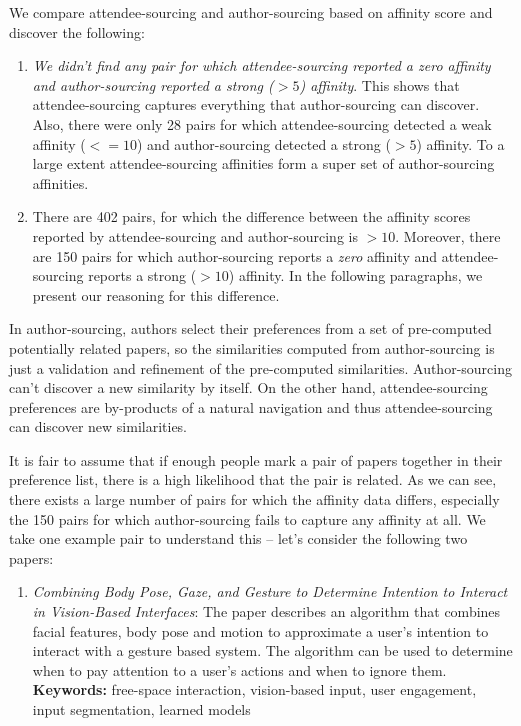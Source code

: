 \documentclass[letterpaper]{article}
\begin{document}
\begin{enumerate}
We compare attendee-sourcing and author-sourcing based on affinity score and discover the following:
\begin{enumerate}
\item \emph{We didn't find any pair for which attendee-sourcing reported a zero affinity and author-sourcing reported a strong ($>5$) affinity}. This shows that attendee-sourcing captures everything that author-sourcing can discover. Also, there were only 28 pairs for which attendee-sourcing detected a weak affinity ($<=10$) and author-sourcing detected a strong ($>5$) affinity. To a large extent attendee-sourcing affinities form a super set of author-sourcing affinities.

\item There are 402 pairs, for which the difference between the affinity scores reported by attendee-sourcing and author-sourcing is $>10$. Moreover, there are 150 pairs for which author-sourcing reports a \emph{zero} affinity and attendee-sourcing reports a strong ($>10$) affinity. In the following paragraphs, we present our reasoning for this difference.

\end{enumerate}
In author-sourcing, authors select their preferences from a set of pre-computed potentially related papers, so the similarities computed from author-sourcing is just a validation and refinement of the pre-computed similarities. Author-sourcing can't discover a new similarity by itself. On the other hand, attendee-sourcing preferences are by-products of a natural navigation and thus attendee-sourcing can discover new similarities.

It is fair to assume that if enough people mark a pair of papers together in their preference list, there is a high likelihood that the pair is related. As we can see, there exists a large number of pairs for which the affinity data differs, especially the 150 pairs for which author-sourcing fails to capture any affinity at all. We take one example pair to understand this -- let's consider the following two papers:
\begin{enumerate}
\item \emph{Combining Body Pose, Gaze, and Gesture to Determine Intention to Interact in Vision-Based Interfaces}: The paper describes an algorithm that combines facial features, body pose and motion to approximate a user's intention to interact with a gesture based system. The algorithm can be used to determine when to pay attention to a user's actions and when to ignore them. \textbf{Keywords:} free-space interaction, vision-based input, user engagement, input segmentation, learned models



\end{enumerate}
\end{enumerate}
\end{document}
